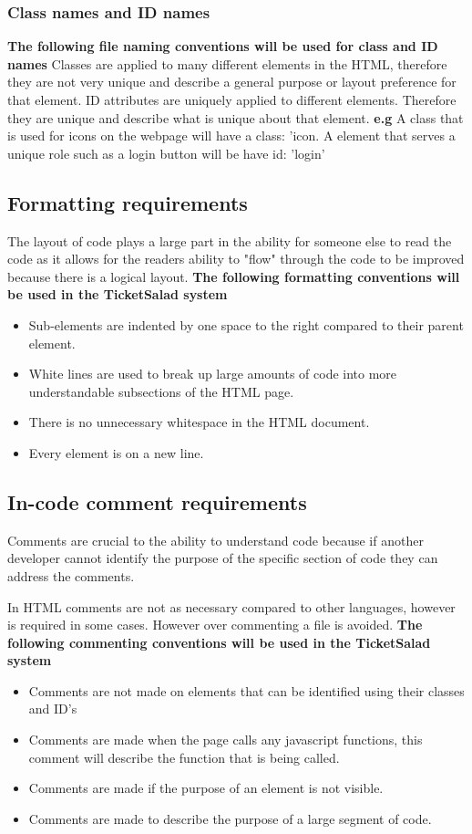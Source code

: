 \documentclass[11pt]{article}
\begin{document}
	\subsubsection{Class names and ID names}
	\textbf{The following file naming conventions will be used for class and ID names}
	\newline
	Classes are applied to many different elements in the HTML, therefore they are not very unique and describe a general purpose or layout preference for that element.
	ID attributes are uniquely applied to different elements. Therefore they are unique and describe what is unique about that element. 
	\textbf{e.g} A class that is used for icons on the webpage will have a class: 'icon. A element that serves a unique role such as a login button will be have id: 'login'
	\subsection{Formatting requirements}
	The layout of code plays a large part in the ability for someone else to read the code as it allows for the readers ability to "flow" through the code to be improved because there is a logical layout.
	\newline
	\textbf{The following formatting conventions will be used in the TicketSalad system}
	
	\begin{itemize}
		\item Sub-elements are indented by one space to the right compared to their parent element.
		\item White lines are used to break up large amounts of code into more understandable subsections of the HTML page.
		\item There is no unnecessary whitespace in the HTML document.
		\item Every element is on a new line.
	\end{itemize}
	\subsection{In-code comment requirements}
	Comments are crucial to the ability to understand code because if another developer cannot identify the purpose of the specific section of code they can address the comments.
	
	In HTML comments are not as necessary compared to other languages, however is required in some cases. However over commenting a file is avoided.
	\newline
	\textbf{The following commenting conventions will be used in the TicketSalad system}
	\begin{itemize}
		\item Comments are not made on elements that can be identified using their classes and ID's
		\item Comments are made when the page calls any javascript functions, this comment will describe the function that is being called.
		\item Comments are made if the purpose of an element is not visible.
		\item Comments are made to describe the purpose of a large segment of code.
	\end{itemize}
\end{document}
